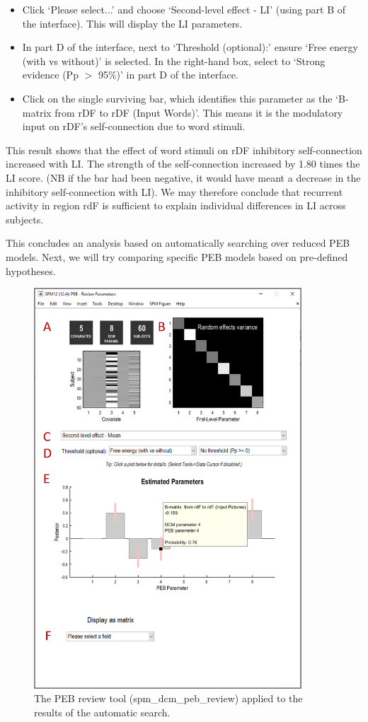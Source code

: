 \documentclass{article}
\begin{document}
\begin{itemize}
    \item Click `Please select...' and choose `Second-level effect - LI' (using part B of the interface). This will display the LI parameters.
    \item In part D of the interface, next to `Threshold (optional):' ensure `Free energy (with vs without)' is selected. In the right-hand box, select to `Strong evidence (Pp $>$ 95\%)' in part D of the interface.
    \item Click on the single surviving bar, which identifies this parameter as the `B-matrix from rDF to rDF (Input Words)'. This means it is the modulatory input on rDF's self-connection due to word stimuli.
\end{itemize}

This result shows that the effect of word stimuli on rDF inhibitory self-connection increased with LI. The strength of the self-connection increased by 1.80 times the LI score. (NB if the bar had been negative, it would have meant a decrease in the inhibitory self-connection with LI). We may therefore conclude that recurrent activity in region rdF is sufficient to explain individual differences in LI across subjects.

This concludes an analysis based on automatically searching over reduced PEB models. Next, we will try comparing specific PEB models based on pre-defined hypotheses.

\begin{figure}[ht]
\begin{center}
\includegraphics[width=10cm]{"Fig_peb_search_review"}
\caption{The PEB review tool (spm\_dcm\_peb\_review) applied to the results of the automatic search.\label{Fig_peb_search_review}}
\end{center}
\end{figure}
\end{document}
